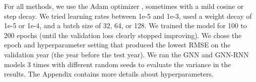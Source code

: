 For all methods, we use the Adam optimizer \cite{kingma2014adam}, sometimes with a mild cosine or step decay. We tried learning rates between 1e-5 and 1e-3, used a weight decay of 1e-5 or 1e-4, and a batch size of 32, 64, or 128. We trained the model  for 100 to 200 epochs (until the validation loss clearly stopped improving). We chose the epoch and hyperparameter setting that produced the lowest RMSE on the validation year (the year before the test year).  We ran the GNN and GNN-RNN models 3 times with different random seeds to evaluate the variance in the results. The Appendix contains more details about hyperparameters. 





